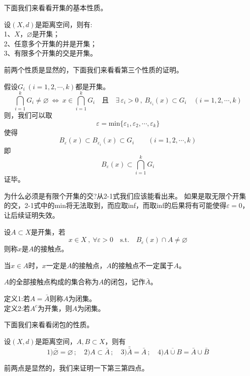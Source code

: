 下面我们来看看开集的基本性质。
\begin{theorem}
    设$(X,d)$是距离空间，则有:\\
    1、$X$，$\varnothing$是开集；\\
    2、任意多个开集的并是开集；\\
    3、有限多个开集的交是开集。
\end{theorem}

前两个性质是显然的，下面我们来看看第三个性质的证明。

假设$G_i \ (i=1,2,\cdots,k)$都是开集。
\[\bigcap_{i=1}^kG_i \neq \varnothing \ \Leftrightarrow \ x \in \bigcap_{i=1}^kG_i  \quad \text{且} \quad \exists \, \varepsilon_i >0 \ , \ B_{\varepsilon_i}(x) \subset G_i \quad (i=1,2,\cdots,k)\]
则，我们可以取
\[\varepsilon=\text{min}\{\varepsilon_1,\varepsilon_2,\cdots,\varepsilon_k\} \tag{2-1}\]
使得
\[B_{\varepsilon}(x) \subset B_{\varepsilon_i}(x) \subset G_i \qquad (i=1,2,\cdots,k)\]
即
\[B_{\varepsilon}(x) \subset \bigcap_{i=1}^kG_i\]
证毕。

为什么必须是有限个开集的交?从2-1式我们应该能看出来。
如果是取无限个开集的交，2-1式中的min将无法取到，而应取inf，而取inf的后果将有可能使得$\varepsilon=0$，让后续证明失效。
\begin{definition}[接触点]
    设$A \subset X$是开集，若
    \[x \in X \ , \ \forall \varepsilon>0 \quad \text{s.t.} \quad B_{\varepsilon}(x) \cap A \neq \varnothing\]
    则称$x$是$A$的接触点。
\end{definition}

当$x \in A$时，$x$一定是$A$的接触点，$A$的接触点不一定属于$A$。

\begin{definition}[闭包]
    $A$的全部接触点构成的集合称为$A$的闭包，记作$\bar{A}$。
\end{definition}
\begin{definition}[闭集]
    定义1:若$A=\bar{A}$则称$A$为闭集。\\
    定义2:若$A^c$为开集，则$A$为闭集。
\end{definition}

下面我们来看看闭包的性质。
\begin{theorem}
    设$(X,d)$是距离空间，$A,B \subset X$，则有
    \[1)\bar{\varnothing}=\varnothing \, ; \quad 2)A \subset \bar{A} \, ; \quad 3)\bar{\bar{A}}=\bar{A} \, ; \quad 4)\overline{A \cup B}=\bar{A} \cup \bar{B}\]
\end{theorem}

前两点是显然的，我们来证明一下第三第四点。

